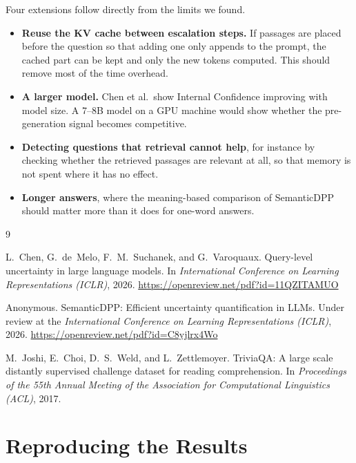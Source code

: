 \documentclass[11pt,a4paper]{article}
\begin{document}
Four extensions follow directly from the limits we found.
\begin{itemize}
\item \textbf{Reuse the KV cache between escalation steps.} If passages are
placed before the question so that adding one only appends to the prompt, the
cached part can be kept and only the new tokens computed. This should remove
most of the time overhead.
\item \textbf{A larger model.} Chen et al.\ show Internal Confidence improving
with model size. A 7--8B model on a GPU machine would show whether the
pre-generation signal becomes competitive.
\item \textbf{Detecting questions that retrieval cannot help}, for instance by
checking whether the retrieved passages are relevant at all, so that memory is
not spent where it has no effect.
\item \textbf{Longer answers}, where the meaning-based comparison of SemanticDPP
should matter more than it does for one-word answers.
\end{itemize}

\begin{thebibliography}{9}

L.~Chen, G.~de~Melo, F.~M.~Suchanek, and G.~Varoquaux.
\newblock Query-level uncertainty in large language models.
\newblock In \emph{International Conference on Learning Representations (ICLR)}, 2026.
\newblock \url{https://openreview.net/pdf?id=11QZITAMUO}

Anonymous.
\newblock SemanticDPP: Efficient uncertainty quantification in LLMs.
\newblock Under review at the \emph{International Conference on Learning Representations (ICLR)}, 2026.
\newblock \url{https://openreview.net/pdf?id=C8yjlrx4Wo}

M.~Joshi, E.~Choi, D.~S.~Weld, and L.~Zettlemoyer.
\newblock TriviaQA: A large scale distantly supervised challenge dataset for reading comprehension.
\newblock In \emph{Proceedings of the 55th Annual Meeting of the Association for Computational Linguistics (ACL)}, 2017.

\end{thebibliography}

\appendix
\section{Reproducing the Results}
\end{document}
